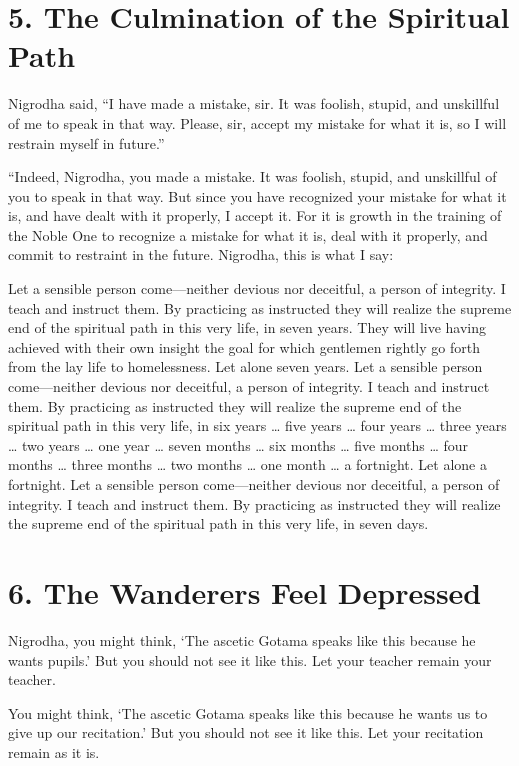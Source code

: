 \documentclass[12pt,openany]{book}%
\begin{document}
\section*{5. The Culmination of the Spiritual Path }

Nigrodha said, “I have made a mistake, sir. It was foolish, stupid, and unskillful of me to speak in that way. Please, sir, accept my mistake for what it is, so I will restrain myself in future.” 

“Indeed, Nigrodha, you made a mistake. It was foolish, stupid, and unskillful of you to speak in that way. But since you have recognized your mistake for what it is, and have dealt with it properly, I accept it. For it is growth in the training of the Noble One to recognize a mistake for what it is, deal with it properly, and commit to restraint in the future. Nigrodha, this is what I say: 

Let a sensible person come—neither devious nor deceitful, a person of integrity. I teach and instruct them. By practicing as instructed they will realize the supreme end of the spiritual path in this very life, in seven years. They will live having achieved with their own insight the goal for which gentlemen rightly go forth from the lay life to homelessness. Let alone seven years. Let a sensible person come—neither devious nor deceitful, a person of integrity. I teach and instruct them. By practicing as instructed they will realize the supreme end of the spiritual path in this very life, in six years … five years … four years … three years … two years … one year … seven months … six months … five months … four months … three months … two months … one month … a fortnight. Let alone a fortnight. Let a sensible person come—neither devious nor deceitful, a person of integrity. I teach and instruct them. By practicing as instructed they will realize the supreme end of the spiritual path in this very life, in seven days. 

\section*{6. The Wanderers Feel Depressed }

Nigrodha, you might think, ‘The ascetic Gotama speaks like this because he wants pupils.’ But you should not see it like this. Let your teacher remain your teacher. 

You might think, ‘The ascetic Gotama speaks like this because he wants us to give up our recitation.’ But you should not see it like this. Let your recitation remain as it is. 
\end{document}
